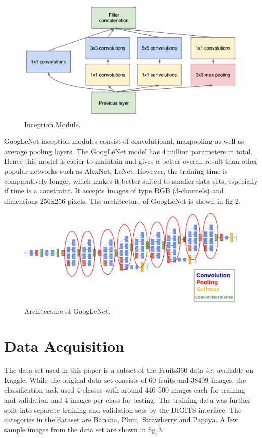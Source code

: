 \documentclass[10pt,journal,compsoc]{IEEEtran}
\begin{document}
\begin{figure}[thpb]
      \centering
      \includegraphics[width=\linewidth]{inc.png}
      \caption{Inception Module.}
      \label{fig:robot1}
\end{figure}

GoogLeNet inception modules consist of convolutional, maxpooling as well as average pooling layers. The GoogLeNet model has 4 million parameters in total. Hence this model is easier to maintain and gives a better overall result than other popular networks such as AlexNet, LeNet. However, the training time is comparatively longer, which makes it better suited to smaller data sets, especially if time is a constraint. It accepts images of type RGB (3-channels) and dimensions 256x256 pixels. The architecture of GoogLeNet is shown in fig 2.

\begin{figure}[thpb]
      \centering
      \includegraphics[width=\linewidth]{goog.png}
      \caption{Architecture of GoogLeNet.}
      \label{fig:robot1}
\end{figure}


\section{Data Acquisition}
The data set used in this paper is a subset of the Fruits360 data set available on Kaggle. While the original data set consists of 60 fruits and 38409 images, the classification task used 4 classes with around 440-500 images each for training and validation and 4 images per class for testing. The training data was further split into separate training and validation sets by the DIGITS interface. The categories in  the dataset are Banana, Plum, Strawberry and Papaya. A few sample images from the data set are shown in fig 3.
\end{document}
